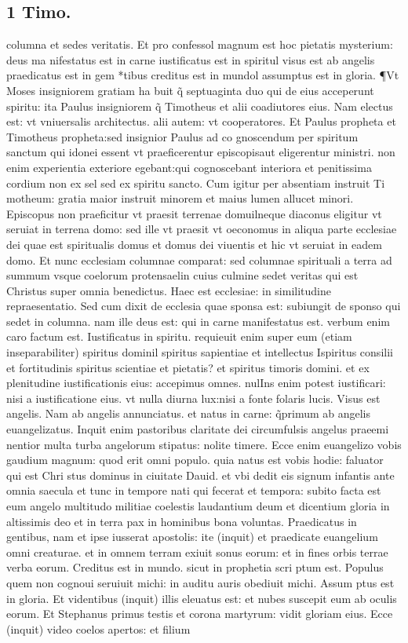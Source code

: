 \documentclass{article}
\begin{document}
\begin{pages}
\section*{1 Timo. }
\marginpar{[ p.206 ]}\pstart columna et sedes veritatis. Et pro confessol magnum est hoc pietatis mysterium: deus ma nifestatus est in carne iustificatus est in spiritul visus est ab angelis praedicatus est in gem *tibus creditus est in mundol assumptus est in gloria. ¶Vt Moses insigniorem gratiam ha buit q̃ septuaginta duo qui de eius acceperunt spiritu: ita Paulus insigniorem q̃ Timotheus et alii coadiutores eius. Nam electus est: vt vniuersalis architectus. alii autem: vt cooperatores. Et Paulus propheta et Timotheus propheta:sed insignior Paulus ad co gnoscendum per spiritum sanctum qui idonei essent vt praeficerentur episcopisaut eligerentur ministri. non enim experientia exteriore egebant:qui cognoscebant interiora et penitissima cordium non ex sel sed ex spiritu sancto. Cum igitur per absentiam instruit Ti motheum: gratia maior instruit minorem et maius lumen allucet minori. Episcopus non praeficitur vt praesit terrenae domuilneque diaconus eligitur vt seruiat in terrena domo: sed ille vt praesit vt oeconomus in aliqua parte ecclesiae dei quae est spiritualis domus et domus dei viuentis et hic vt seruiat in eadem domo. Et nunc ecclesiam columnae comparat: sed columnae spirituali a terra ad summum vsque coelorum protensaelin cuius culmine sedet veritas qui est Christus super omnia benedictus. Haec est ecclesiae: in similitudine repraesentatio. Sed cum dixit de ecclesia quae sponsa est: subiungit de sponso qui sedet in columna. nam ille deus est: qui in carne manifestatus est. verbum enim caro factum est. Iustificatus in spiritu. requieuit enim super eum (etiam inseparabiliter) spiritus dominil spiritus sapientiae et intellectus Ispiritus consilii et fortitudinis spiritus scientiae et pietatis? et spiritus timoris domini. et ex plenitudine iustificationis eius: accepimus omnes. nulIns enim potest iustificari: nisi a iustificatione eius. vt nulla diurna lux:nisi a fonte folaris lucis. Visus est angelis. Nam ab angelis annunciatus. et natus in carne: q̃primum ab angelis euangelizatus. Inquit enim pastoribus claritate dei circumfulsis angelus praeemi nentior multa turba angelorum stipatus: nolite timere. Ecce enim euangelizo vobis gaudium magnum: quod erit omni populo. quia natus est vobis hodie: faluator qui est Chri stus dominus in ciuitate Dauid. et vbi dedit eis signum infantis ante omnia saecula et tunc in tempore nati qui fecerat et tempora: subito facta est eum angelo multitudo militiae coelestis laudantium deum et dicentium gloria in altissimis deo et in terra pax  in hominibus bona voluntas. Praedicatus in gentibus, nam et ipse iusserat apostolis: ite (inquit) et praedicate euangelium omni creaturae. et in omnem terram exiuit sonus eorum: et in fines orbis terrae verba eorum. Creditus est in mundo. sicut in prophetia scri ptum est. Populus quem non cognoui seruiuit michi: in auditu auris obediuit michi. Assum ptus est in gloria. Et videntibus (inquit) illis eleuatus est: et nubes suscepit eum ab oculis eorum. Et Stephanus primus testis et corona martyrum: vidit gloriam eius. Ecce (inquit) video coelos apertos: et filium 
\end{pages}
\end{document}
